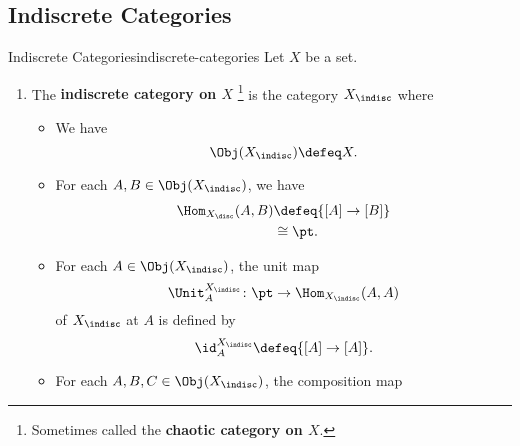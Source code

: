 \subsection{Indiscrete Categories}\label{subsection-the-quadruple-adjunction-with-sets-indiscrete-categories}
\begin{definition}{Indiscrete Categories}{indiscrete-categories}%
    Let $X$ be a set.
    \begin{enumerate}
        \item\label{indiscrete-categories-the-indiscrete-category-on-a-set}The \textbf{indiscrete category on $X$}%
            \footnote{%
                Sometimes called the \textbf{chaotic category on $X$}.
                \par\vspace*{\TCBBoxCorrection}
            } %
            is the category $X_{\indisc}$ where
            \begin{itemize}
                \item{}We have
                    \[
                        \Obj(X_{\indisc})
                        \defeq
                        X.
                    \]%
                \item{}For each $A,B\in\Obj(X_{\indisc})$, we have
                    \begin{align*}
                        \Hom_{X_{\disc}}(A,B) &\defeq \{[A]\to[B]\}\\
                                              &\cong  \pt.
                    \end{align*}
                \item{}For each $A\in\Obj(X_{\indisc})$, the unit map
                    \[
                        \Unit^{X_{\indisc}}_{A}
                        \colon
                        \pt
                        \to
                        \Hom_{X_{\indisc}}(A,A)
                    \]%
                    of $X_{\indisc}$ at $A$ is defined by
                    \[
                        \id^{X_{\indisc}}_{A}
                        \defeq
                        \{[A]\to[A]\}.
                    \]%
                \item{}For each $A,B,C\in\Obj(X_{\indisc})$, the composition map
                    \[
\]
\end{itemize}
\end{enumerate}
\end{definition}
